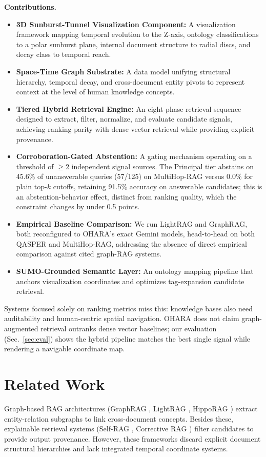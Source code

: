 \documentclass[conference,a4paper]{IEEEtran}
\begin{document}
\textbf{Contributions.}
\begin{itemize}
\item \textbf{3D Sunburst-Tunnel Visualization Component:} A visualization framework mapping temporal evolution to the Z-axis, ontology classifications to a polar sunburst plane, internal document structure to radial discs, and decay class to temporal reach.
\item \textbf{Space-Time Graph Substrate:} A data model unifying structural hierarchy, temporal decay, and cross-document entity pivots to represent context at the level of human knowledge concepts.
\item \textbf{Tiered Hybrid Retrieval Engine:} An eight-phase retrieval sequence designed to extract, filter, normalize, and evaluate candidate signals, achieving ranking parity with dense vector retrieval while providing explicit provenance.
\item \textbf{Corroboration-Gated Abstention:} A gating mechanism operating on a threshold of $\geq$2 independent signal sources. The Principal tier abstains on 45.6\% of unanswerable queries (57/125) on MultiHop-RAG versus 0.0\% for plain top-$k$ cutoffs, retaining 91.5\% accuracy on answerable candidates; this is an abstention-behavior effect, distinct from ranking quality, which the constraint changes by under 0.5 points.
\item \textbf{Empirical Baseline Comparison:} We run LightRAG and GraphRAG, both reconfigured to OHARA's exact Gemini models, head-to-head on both QASPER and MultiHop-RAG, addressing the absence of direct empirical comparison against cited graph-RAG systems.
\item \textbf{SUMO-Grounded Semantic Layer:} An ontology mapping pipeline that anchors visualization coordinates and optimizes tag-expansion candidate retrieval.
\end{itemize}

Systems focused solely on ranking metrics miss this: knowledge bases also need auditability and human-centric spatial navigation. OHARA does not claim graph-augmented retrieval outranks dense vector baselines; our evaluation (Sec.~\ref{sec:eval}) shows the hybrid pipeline matches the best single signal while rendering a navigable coordinate map.

\section{Related Work}

Graph-based RAG architectures (GraphRAG \cite{edge2024graphrag}, LightRAG \cite{guo2024lightrag}, HippoRAG \cite{gutierrez2024hipporag}) extract entity-relation subgraphs to link cross-document concepts. Besides these, explainable retrieval systems (Self-RAG \cite{asai2023selfrag}, Corrective RAG \cite{yan2024crag}) filter candidates to provide output provenance. However, these frameworks discard explicit document structural hierarchies and lack integrated temporal coordinate systems.
\end{document}

